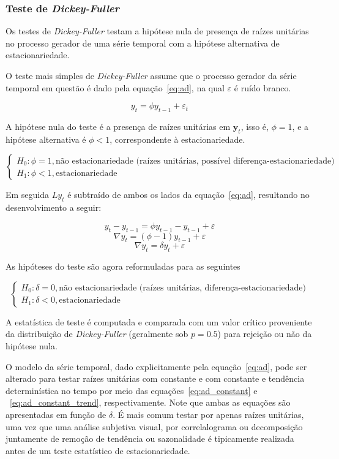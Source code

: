 \subsubsection{Teste de \emph{Dickey-Fuller}}

Os testes de \emph{Dickey-Fuller} testam a hipótese nula de presença de raízes
unitárias no processo gerador de uma série temporal com a hipótese alternativa
de estacionariedade.

O teste mais simples de \emph{Dickey-Fuller} assume que o processo gerador da
série temporal em questão é dado pela equação~\ref{eq:ad}, na qual
$\varepsilon$ é ruído branco.

\begin{equation}\label{eq:ad}
    y_t = \phi y_{t-1} + \varepsilon_t
\end{equation}

A hipótese nula do teste é a presença de raízes unitárias em $\mathbf{y}_t$,
isso é, $\phi = 1$, e a hipótese alternativa é $\phi < 1$, correspondente à
estacionariedade.

$$
\begin{cases}
    H_0: \phi = 1, \text{não estacionariedade (raízes unitárias, possível diferença-estacionariedade)} \\
    H_1: \phi < 1, \text{estacionariedade}
\end{cases}
$$

Em seguida $Ly_t$ é subtraído de ambos os lados da equação~\ref{eq:ad},
resultando no desenvolvimento a seguir:

$$ y_t - y_{t-1} = \phi y_{t-1} - y_{t-1} + \varepsilon $$
$$ \nabla y_t = (\phi - 1) y_{t-1}  + \varepsilon $$
$$ \nabla y_t = \delta y_t  + \varepsilon $$

As hipóteses do teste são agora reformuladas para as seguintes

$$
\begin{cases}
    H_0: \delta = 0, \text{não estacionariedade (raízes unitárias, diferença-estacionariedade)} \\
    H_1: \delta < 0, \text{estacionariedade}
\end{cases}
$$

A estatística de teste é computada e comparada com um valor crítico proveniente
da distribuição de \emph{Dickey-Fuller} (geralmente sob $p=0.5$) para rejeição
ou não da hipótese nula.

O modelo da série temporal, dado explicitamente pela equação~\ref{eq:ad}, pode
ser alterado para testar raízes unitárias com constante e com constante e
tendência determinística no tempo por meio das equações~\ref{eq:ad_constant} e
~\ref{eq:ad_constant_trend}, respectivamente. Note que ambas as equações são
apresentadas em função de $\delta$. É mais comum testar por apenas raízes
unitárias, uma vez que uma análise subjetiva visual, por correlalograma ou
decomposição juntamente de remoção de tendência ou sazonalidade é tipicamente
realizada antes de um teste estatístico de estacionariedade.

